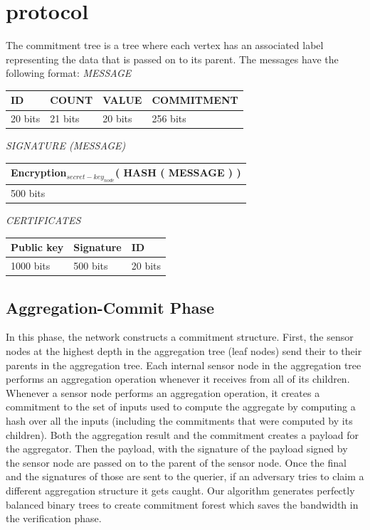 \chapter{protocol}

	The commitment tree is a tree where each vertex has an associated label representing the data that is passed on to its parent. The messages have the following format: 
	\textit{MESSAGE}
	\newline
	
	\begin{tabular}{ | l | l | l | l |}
		\hline
		ID & COUNT & VALUE & COMMITMENT \\
		\hline
		20 bits & 21 bits & 20 bits & 256 bits\\
		\hline
	\end{tabular}
	\newline
	\newline
	\textit{SIGNATURE (MESSAGE)}
	\newline

	\begin{tabular}{ |l| }
		\hline
		Encryption$_{secret-key_{node}}$( HASH ( MESSAGE ) )\\
		\hline
		500 bits\\
		\hline
	\end{tabular}
	\newline
	\newline
	\textit{CERTIFICATES}
	\newline

	\begin{tabular}{ | l | l | l | }
		\hline
			Public key  & Signature & ID \\
		\hline
			1000 bits & 500 bits & 20 bits \\
		\hline

	\end{tabular}

	\newpage

\section{Aggregation-Commit Phase}
	In this phase, the network constructs a commitment structure. 
	First, the sensor nodes at the highest depth in the aggregation tree (leaf nodes) send their \payloads to their parents in the aggregation tree.
	Each internal sensor node in the aggregation tree performs an aggregation operation whenever it receives \payloads from all of its children.
	Whenever a sensor node performs an aggregation operation, it creates a commitment to the set of inputs used to compute the aggregate by computing a hash over all the inputs (including the commitments that were computed by its children). 
	Both the aggregation result and the commitment creates a payload for the aggregator.
	Then the payload, with the signature of the payload signed by the sensor node are passed on to the parent of the sensor node.
	Once the final \payloads and the signatures of those \payloads are sent to the querier, if an adversary tries to claim a different aggregation structure it gets caught.
	Our algorithm generates perfectly balanced binary trees to create commitment forest which saves the bandwidth in the verification phase.

